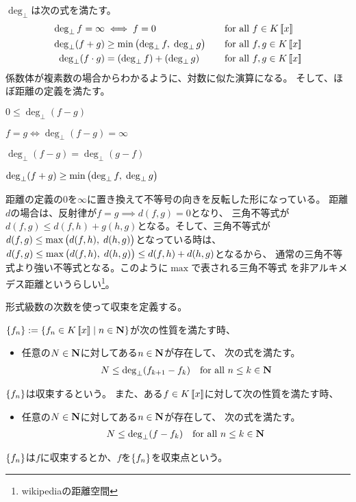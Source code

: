 {	$\deg_\bot$は次の式を満たす。
	\begin{alignat*}{2}
		\deg_\bot f= \infty &\iff f = 0 
			&&\quad\text{for all } f\in K\bblr{x} \\
		\deg_\bot(f + g) &\ge \min\plrg{\deg_\bot f,\; \deg_\bot g}
			&&\quad\text{for all } f,g\in K\bblr{x} \\
		\deg_\bot(f\cdot g) &= (\deg_\bot f) + (\deg_\bot g)
			&&\quad\text{for all } f,g\in K\bblr{x} %
	\end{alignat*}
	係数体が複素数の場合からわかるように、対数に似た演算になる。
	そして、ほぼ距離の定義を満たす。
	\begin{description}\setlength{\itemsep}{-1mm} %
		\item[非負] $0\le \deg_\bot(f - g)$
		\item[反射] $f = g\iff \deg_\bot(f - g) = \infty$
		\item[対称] $\deg_\bot(f - g) = \deg_\bot(g - f)$
		\item[三角] $\deg_\bot(f + g)\ge\min\mathinner{\bigl({\deg_\bot f,\;\deg_\bot g}\bigr)}$
	\end{description} %
	距離の定義の$0$を$\infty$に置き換えて不等号の向きを反転した形になっている。
	距離$d$の場合は、反射律が$f=g\implies d(f,g)=0$となり、
	三角不等式が$d(f,g)\le d(f,h)+g(h,g)$となる。そして、三角不等式が
	$d(f,g)\le\max\mathinner{\bigl({d(f,h),\;d(h,g)}\bigr)}$となっている時は、
	$d(f,g)\le\max\mathinner{\bigl({d(f,h),\;d(h,g)}\bigr)}\le d(f,h)+d(h,g)$となるから、
	通常の三角不等式より強い不等式となる。このように$\max$で表される三角不等式
	を非アルキメデス距離というらしい\footnote{
		wikipediaの距離空間
	}。

	形式級数の次数を使って収束を定義する。

	\begin{definition}[形式級数の収束]\label{def:形式級数の収束} %
		$\mathinner{\{{f_n}\}}:=\mathinner{\{{f_n\in K\mathinner{[\![{x}]\!]}\mid n\in\ensuremath{\mathbf{N}}}\}}$が次の性質を満たす時、
		\begin{itemize}\setlength{\itemsep}{-1mm} %
			\item 任意の$N\in\mathbf{N}$に対してある$n\in\mathbf{N}$が存在して、
			次の式を満たす。
			\begin{equation*}\begin{split}
				N\le \deg_\bot(f_{k+1} - f_k) \quad\text{for all } n\le k\in\mathbf{N}
			\end{split}\end{equation*}
		\end{itemize} %
		$\mathinner{\{{f_n}\}}$は収束するという。
		また、ある$f\in K\mathinner{[\![{x}]\!]}$に対して次の性質を満たす時、
		\begin{itemize}\setlength{\itemsep}{-1mm} %
			\item 任意の$N\in\mathbf{N}$に対してある$n\in\mathbf{N}$が存在して、
			次の式を満たす。
			\begin{equation*}\begin{split}
				N\le \deg_\bot(f - f_k) \quad\text{for all } n\le k\in\mathbf{N}
			\end{split}\end{equation*}
		\end{itemize} %
		$\mathinner{\{{f_n}\}}$は$f$に収束するとか、$f$を$\mathinner{\{{f_n}\}}$を収束点という。\EOP
	\end{definition} %

}
